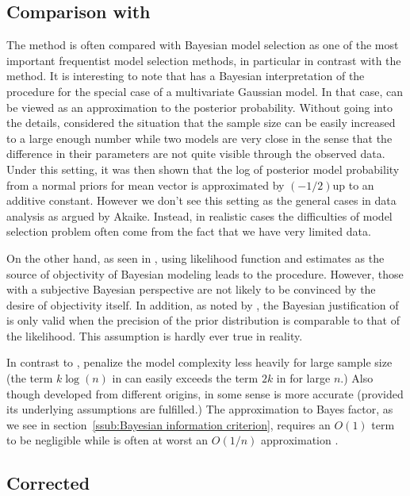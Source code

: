 \subsection{Comparison with \protect\bic}
\label{sub:Comparison with bic}

The \aic method is often compared with Bayesian model selection as one of the
most important frequentist model selection methods, in particular in contrast
with the \bic method. It is interesting to note that \cite{Akaike:1978ti}
has a Bayesian interpretation of the \aic procedure for the special case of a
multivariate Gaussian model. In that case, \aic can be viewed as an
approximation to the posterior probability. Without going into the details,
\cite{Akaike:1978ti} considered the situation that the sample size can be
easily increased to a large enough number while two models are very close in
the sense that the difference in their parameters are not quite visible
through the observed data. Under this setting, it was then shown that the log
of posterior model probability from a normal priors for mean vector is
approximated by $(-1/2)$\aic up to an additive constant. However we don't see
this setting as the general cases in data analysis as argued by Akaike.
Instead, in realistic cases the difficulties of model selection problem often
come from the fact that we have very limited data.

On the other hand, as seen in \cite{Akaike:1980gh}, using likelihood
function and \aic estimates as the source of objectivity of Bayesian
modeling leads to the \bic procedure. However, those with a subjective
Bayesian perspective are not likely to be convinced by the desire of
objectivity itself. In addition, as noted by \cite{Kass:1995vb}, the
Bayesian justification of \aic is only valid when the precision of the prior
distribution is comparable to that of the likelihood. This assumption is
hardly ever true in reality.

In contrast to \bic, \aic penalize the model complexity less heavily for large
sample size (the term $k\log(n)$ in \bic can easily exceeds the term $2k$ in
\aic for large $n$.) Also though developed from different origins, in some
sense \aic is more accurate (provided its underlying assumptions are
fulfilled.) The \bic approximation to Bayes factor, as we see in
section~\ref{ssub:Bayesian information criterion}, requires an $O(1)$ term to
be negligible while \aic is often at worst an $O(1/n)$ approximation
\cite{Akaike:1973uc}.

\subsection{Corrected \protect\aic}
\label{sub:Corrected aic}

